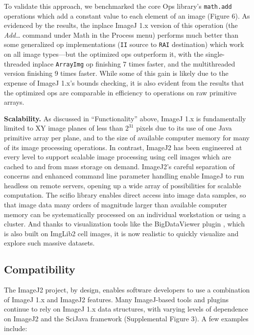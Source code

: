 \documentclass{bmcart}
\begin{document}
To validate this approach, we benchmarked the core Ops library's
\texttt{math.add} operations which add a constant value to each element of an
image (Figure 6). As evidenced by the results, the inplace ImageJ 1.x version
of this operation (the \textit{Add\ldots} command under Math in the Process
menu) performs much better than some generalized op implementations
(\texttt{II} source to \texttt{RAI} destination) which work on all image
types---but the optimized ops outperform it, with the single-threaded inplace
\texttt{ArrayImg} op finishing 7 times faster, and the multithreaded version
finishing 9 times faster. While some of this gain is likely due to the expense
of ImageJ 1.x's bounds checking, it is also evident from the results that the
optimized ops are comparable in efficiency to operations on raw primitive
arrays.

\textbf{Scalability.} As discussed in ``Functionality'' above, ImageJ 1.x is
fundamentally limited to XY image planes of less than $2^{31}$ pixels due to
its use of one Java primitive array per plane, and to the size of available
computer memory for many of its image processing operations. In contrast,
ImageJ2 has been engineered at every level to support scalable image processing
using cell images which are cached to and from mass storage on demand.
ImageJ2's careful separation of concerns and enhanced command line parameter
handling enable ImageJ to run headless on remote servers, opening up a wide
array of possibilities for scalable computation. The \acrshort{scifio} library
enables direct access into image data samples, so that image data many orders
of magnitude larger than available computer memory can be systematically
processed on an individual workstation or using a cluster. And thanks to
visualization tools like the BigDataViewer plugin \cite{bigdataviewer}, which
is also built on ImgLib2 cell images, it is now realistic to quickly visualize
and explore such massive datasets.

\subsection*{Compatibility}
The ImageJ2 project, by design, enables software developers to use a
combination of ImageJ 1.x and ImageJ2 features. Many ImageJ-based tools and
plugins continue to rely on ImageJ 1.x data structures, with varying levels of
dependence on ImageJ2 and the SciJava framework (Supplemental Figure 3). A few
examples include:
\end{document}
